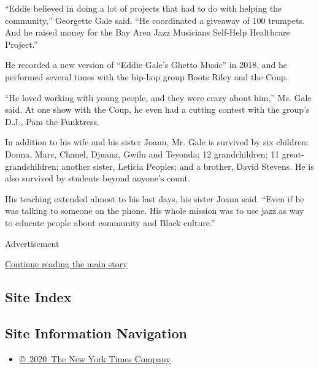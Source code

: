 ``Eddie believed in doing a lot of projects that had to do with helping
the community,'' Georgette Gale said. ``He coordinated a giveaway of 100
trumpets. And he raised money for the Bay Area Jazz Musicians Self-Help
Healthcare Project.''

He recorded a new version of ``Eddie Gale's Ghetto Music'' in 2018, and
he performed several times with the hip-hop group Boots Riley and the
Coup.

``He loved working with young people, and they were crazy about him,''
Ms. Gale said. At one show with the Coup, he even had a cutting contest
with the group's D.J., Pam the Funktress.

In addition to his wife and his sister Joann, Mr. Gale is survived by
six children: Donna, Marc, Chanel, Djuana, Gwilu and Teyonda; 12
grandchildren; 11 great-grandchildren; another sister, Leticia Peoples;
and a brother, David Stevens. He is also survived by students beyond
anyone's count.

His teaching extended almost to his last days, his sister Joann said.
``Even if he was talking to someone on the phone. His whole mission was
to use jazz as way to educate people about community and Black
culture.''

Advertisement

\protect\hyperlink{after-bottom}{Continue reading the main story}

\hypertarget{site-index}{%
\subsection{Site Index}\label{site-index}}

\hypertarget{site-information-navigation}{%
\subsection{Site Information
Navigation}\label{site-information-navigation}}

\begin{itemize}
\tightlist
\item
  \href{https://help.nytimes.com/hc/en-us/articles/115014792127-Copyright-notice}{©~2020~The
  New York Times Company}
\end{itemize}


